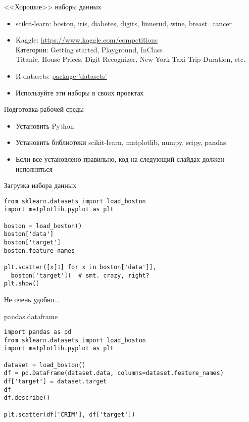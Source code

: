\documentclass[landscape]{slides}
\begin{document}
\begin{slide}
<<Хорошие>> наборы данных
\begin{itemize}
\item scikit-learn: boston, iris, diabetes, digits, linnerud, wine, breast\_cancer
\item Kaggle: \url{https://www.kaggle.com/competitions}\\
Категории: Getting started, Playground, InClass\\
Titanic, House Prices, Digit Recognizer, New York Taxi Trip Duration, etc.
\item R datasets: \href{https://stat.ethz.ch/R-manual/R-devel/library/datasets/html/00Index.html}{package 'datasets'}
\item Используйте эти наборы в своих проектах
\end{itemize}	
\end{slide}

\begin{slide}
Подготовка рабочей среды
\begin{itemize}
\item Установить Python
\item Установить библиотеки scikit-learn, matplotlib, numpy, scipy, pandas
\item Если все установлено правильно, код на следующий слайдах должен исполняться
\end{itemize}	
\end{slide}


\begin{slide}
Загрузка набора данных
\begin{verbatim}
from sklearn.datasets import load_boston
import matplotlib.pyplot as plt

boston = load_boston()
boston['data']
boston['target']
boston.feature_names

plt.scatter([x[1] for x in boston['data']],
  boston['target'])  # smt. crazy, right?
plt.show()
\end{verbatim}
Не очень удобно...
\end{slide}

\begin{slide}
pandas.dataframe
\begin{verbatim}
import pandas as pd 
from sklearn.datasets import load_boston
import matplotlib.pyplot as plt

dataset = load_boston()
df = pd.DataFrame(dataset.data, columns=dataset.feature_names)
df['target'] = dataset.target
df
df.describe()

plt.scatter(df['CRIM'], df['target'])
\end{verbatim}
\end{slide}
\end{document}
